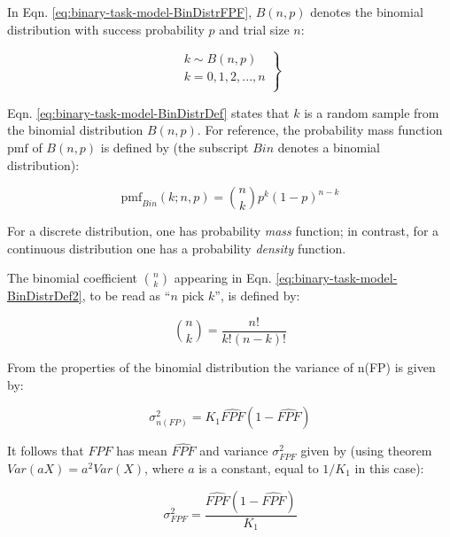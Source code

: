 \documentclass[
]{book}
\begin{document}
In Eqn. \eqref{eq:binary-task-model-BinDistrFPF}, \(B(n,p)\) denotes the binomial distribution with success probability \(p\) and trial size \(n\):

\begin{equation} 
\left.\begin{matrix}
k \sim B\left ( n, p \right )\\
k=0,1,2,...,n\\
\end{matrix}\right\}
\label{eq:binary-task-model-BinDistrDef}
\end{equation}

Eqn. \eqref{eq:binary-task-model-BinDistrDef} states that \(k\) is a random sample from the binomial distribution \(B(n,p)\). For reference, the probability mass function \(\text{pmf}\) of \(B(n,p)\) is defined by (the subscript \(Bin\) denotes a binomial distribution):

\begin{equation} 
\text{pmf}_{Bin}\left ( k;n,p \right )=\binom{n}{k}p^k(1-p)^{n-k}
\label{eq:binary-task-model-BinDistrDef2}
\end{equation}

For a discrete distribution, one has probability \emph{mass} function; in contrast, for a continuous distribution one has a probability \emph{density} function.

The binomial coefficient \(\binom{n}{k}\) appearing in Eqn. \eqref{eq:binary-task-model-BinDistrDef2}, to be read as ``\(n\) pick \(k\)'', is defined by:

\begin{equation} 
\binom{n}{k}=\frac{n!}{k!(n-k)!}
\label{eq:binary-task-model-BinCoeff}
\end{equation}

From the properties of the binomial distribution the variance of n(FP) is given by:

\begin{equation} 
\sigma_{n(FP)}^2=K_1\widehat{FPF}\left ( 1 - \widehat{FPF} \right )
\label{eq:binary-task-model-Var-n-FP}
\end{equation}

It follows that \(FPF\) has mean \(\widehat{FPF}\) and variance \(\sigma_{FPF}^2\) given by (using theorem \(Var(aX) = a^2 Var(X)\), where \(a\) is a constant, equal to \(1/K_1\) in this case):

\begin{equation} 
\sigma_{FPF}^2 = \frac{\widehat{FPF}\left ( 1 - \widehat{FPF} \right )}{K_1}
\label{eq:binary-task-model-Var-FPF}
\end{equation}
\end{document}
